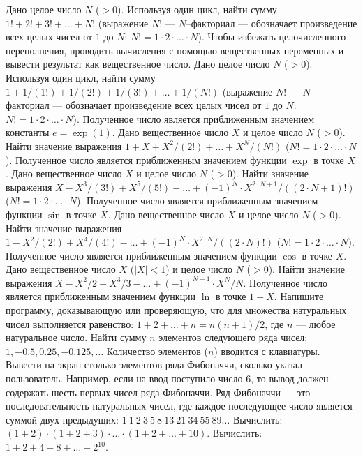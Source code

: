Дано целое число $N$ ($> 0$). Используя один цикл, найти сумму $1! + 2! + 3! + \dots + N!$ (выражение $N!$ --- $N$--факториал --- обозначает произведение всех целых чисел от $1$ до $N$: $N! = 1 \cdot 2 \cdot \ldots \cdot N$). Чтобы избежать целочисленного переполнения, проводить вычисления с помощью вещественных переменных и вывести результат как вещественное число.
Дано целое число $N$ ($> 0$). Используя один цикл, найти сумму $1 + 1/(1!) + 1/(2!) + 1/(3!) + \dots + 1/(N!)$ (выражение $N!$ --- $N$--факториал --- обозначает произведение всех целых чисел от $1$ до $N$: $N! = 1 \cdot 2 \cdot \ldots \cdot N$). Полученное число является приближенным значением константы $e = \exp(1)$.
Дано вещественное число $X$ и целое число $N$ ($> 0$). Найти значение выражения $1 + X + X^2/(2!) + \dots + X^N/(N!)$ ($N! = 1 \cdot 2 \cdot \ldots \cdot N$). Полученное число является приближенным значением функции $\exp$ в точке $X$.
Дано вещественное число $X$ и целое число $N$ ($> 0$). Найти значение выражения $X - X^3/(3!) + X^5/(5!) - \dots + (-1)^N \cdot X^{2 \cdot N + 1}/((2 \cdot N + 1)!)$ ($N! = 1 \cdot 2 \cdot \ldots \cdot N$). Полученное число является приближенным значением функции $\sin$ в точке $X$.
Дано вещественное число $X$ и целое число $N$ ($> 0$). Найти значение выражения $1 - X^2/(2!) + X^4/(4!) - \dots + (-1)^N \cdot X^{2 \cdot N}/((2 \cdot N)!)$ ($N! = 1 \cdot 2 \cdot \ldots \cdot N$). Полученное число является приближенным значением функции $\cos$ в точке $X$.
Дано вещественное число $X$ ($|X| < 1$) и целое число $N$ ($> 0$). Найти значение выражения $X - X^2/2 + X^3/3 - \dots + (-1)^{N - 1} \cdot X^N/N$. Полученное число является приближенным значением функции $\ln$ в точке $1 + X$.
Напишите программу, доказывающую или проверяющую, что для множества натуральных чисел выполняется равенство: $1 + 2 + \dots + n = n(n + 1)/2$, где $n$ --- любое натуральное число.
Найти сумму $n$ элементов следующего ряда чисел: $1, -0.5, 0.25, -0.125, \dots$ Количество элементов ($n$) вводится с клавиатуры.
Вывести на экран столько элементов ряда Фибоначчи, сколько указал пользователь. Например, если на ввод поступило число $6$, то вывод должен содержать шесть первых чисел ряда Фибоначчи. Ряд Фибоначчи --- это последовательность натуральных чисел, где каждое последующее число является суммой двух предыдущих: $1 \ 1 \ 2 \ 3 \ 5 \ 8 \ 13 \ 21 \ 34 \ 55 \ 89 \dots$
Вычислить: $(1 + 2) \cdot (1 + 2 + 3) \cdot \dots \cdot (1 + 2 + \dots + 10)$.
Вычислить: $1 + 2 + 4 + 8 + \dots + 2^{10}$.
